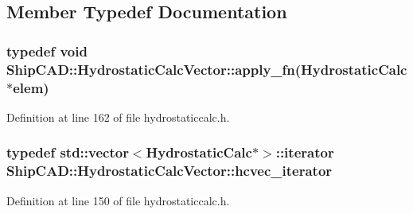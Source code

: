 \subsection{Member Typedef Documentation}
\hypertarget{classShipCAD_1_1HydrostaticCalcVector_aba4bf648866d2fee843a3b1f3b366522}{
\subsubsection[{apply\-\_\-fn}]{\setlength{\rightskip}{0pt plus 5cm}typedef void Ship\-C\-A\-D\-::\-Hydrostatic\-Calc\-Vector\-::apply\-\_\-fn({\bf Hydrostatic\-Calc} $\ast$elem)}}\label{classShipCAD_1_1HydrostaticCalcVector_aba4bf648866d2fee843a3b1f3b366522}


Definition at line 162 of file hydrostaticcalc.\-h.

\hypertarget{classShipCAD_1_1HydrostaticCalcVector_aecdea2f034955ae53b4d0855332491e5}{
\subsubsection[{hcvec\-\_\-iterator}]{\setlength{\rightskip}{0pt plus 5cm}typedef std\-::vector$<${\bf Hydrostatic\-Calc}$\ast$$>$\-::iterator {\bf Ship\-C\-A\-D\-::\-Hydrostatic\-Calc\-Vector\-::hcvec\-\_\-iterator}}}\label{classShipCAD_1_1HydrostaticCalcVector_aecdea2f034955ae53b4d0855332491e5}


Definition at line 150 of file hydrostaticcalc.\-h.



